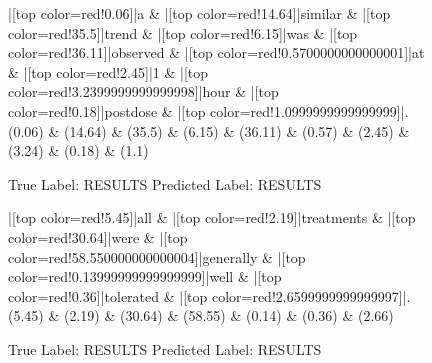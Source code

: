 \documentclass[a4paper, landscape]{article}
\begin{document}
\clearpage
\begin{figure}
\begin{center}
\begin{dependency}
\begin{deptext}
|[top color=red!0.06]|a \& |[top color=red!14.64]|similar \& |[top color=red!35.5]|trend \& |[top color=red!6.15]|was \& |[top color=red!36.11]|observed \& |[top color=red!0.5700000000000001]|at \& |[top color=red!2.45]|1 \& |[top color=red!3.2399999999999998]|hour \& |[top color=red!0.18]|postdose \& |[top color=red!1.0999999999999999]|.\\
(0.06) \& (14.64) \& (35.5) \& (6.15) \& (36.11) \& (0.57) \& (2.45) \& (3.24) \& (0.18) \& (1.1)\\
\end{deptext}
\end{dependency}
\end{center}
\caption{True Label: RESULTS Predicted Label: RESULTS}
\end{figure}
\clearpage
\begin{figure}
\begin{center}
\begin{dependency}
\begin{deptext}
|[top color=red!5.45]|all \& |[top color=red!2.19]|treatments \& |[top color=red!30.64]|were \& |[top color=red!58.550000000000004]|generally \& |[top color=red!0.13999999999999999]|well \& |[top color=red!0.36]|tolerated \& |[top color=red!2.6599999999999997]|.\\
(5.45) \& (2.19) \& (30.64) \& (58.55) \& (0.14) \& (0.36) \& (2.66)\\
\end{deptext}
\end{dependency}
\end{center}
\caption{True Label: RESULTS Predicted Label: RESULTS}
\end{figure}
\clearpage
\end{document}
